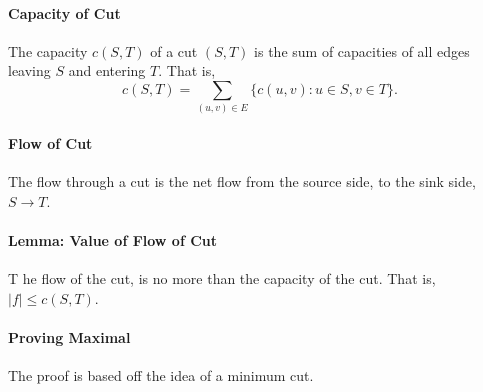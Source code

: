 \paragraph{Capacity of Cut}
The capacity \( c(S, T) \) of a cut  \( (S, T) \)
is the sum of capacities of all edges leaving  \( S \) and entering \( T \).
That is, \[
    c(S, T) = \sum_{(u, v) \in  E} \{ c(u, v) : u \in S, v \in T \} 
.\]


\paragraph{Flow of Cut}
The flow through a cut is the net flow from the source side, to the sink side,
\( S \to  T \).

\paragraph{Lemma: Value of Flow of Cut}
T he flow of the cut, is no more than the capacity of the cut.
That is, \( |f| \leq c(S, T) \).


\paragraph{Proving Maximal}
The proof is based off the idea of a minimum cut.




